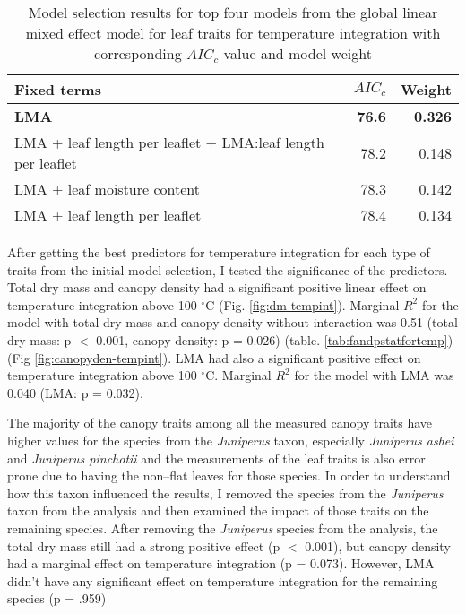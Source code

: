 \documentclass[12pt]{report}
\begin{document}

\begin{table}
    \centering
    \caption{Model selection results for top four models from the global linear mixed effect model for leaf traits for temperature integration with corresponding $AIC_{c}$ value and model weight}
    \vspace{0.5 cm}
    \begin{tabular}{lrr}
    \hline
    \textbf{Fixed terms} & $AIC_{c}$ & \textbf{Weight}\\
    \hline
    \textbf{LMA} & \textbf{76.6} & \textbf{0.326} \\
    LMA + leaf length per leaflet + LMA:leaf length per leaflet & 78.2     & 0.148    \\
    LMA + leaf moisture content                                 & 78.3     & 0.142    \\
    LMA + leaf length per leaflet                               & 78.4     & 0.134    \\
    \end{tabular}
    \label{tab:leaf_models}
\end{table}




After getting the best predictors for temperature integration for each type of traits from the initial model selection,
I tested the significance of the predictors. Total dry mass and canopy density had a significant positive linear effect %
on temperature integration above 100 $^{\circ}$C (Fig. \ref{fig:dm-tempint}). Marginal $R^2$ for the model with total dry mass and canopy density without interaction was 0.51 (total dry mass: p $<$ 0.001, canopy density: p = 0.026) (table. \ref{tab:fandpstatfortemp}) (Fig \ref{fig:canopyden-tempint}). LMA had also a significant positive effect on temperature integration above 100 $^{\circ}$C. Marginal $R^2$ for the model with LMA was 0.040 (LMA: p = 0.032). 

The majority of the canopy traits among all the measured canopy traits have higher values for the species from the \emph{Juniperus} taxon, especially \emph{Juniperus ashei} and \emph{Juniperus pinchotii} and the measurements of the leaf traits is also error prone due to having the non--flat leaves for those species. In order to understand how this taxon influenced the results, I removed the species from the \emph{Juniperus} taxon from the analysis and then examined the impact of those traits on the remaining species. After removing the \emph{Juniperus} species from the analysis, the total dry mass still had a strong positive effect (p $<$ 0.001), but canopy density had a marginal effect on temperature integration (p = 0.073). However, LMA didn't have any significant effect on temperature integration for the remaining species (p = .959) 
\end{document}
